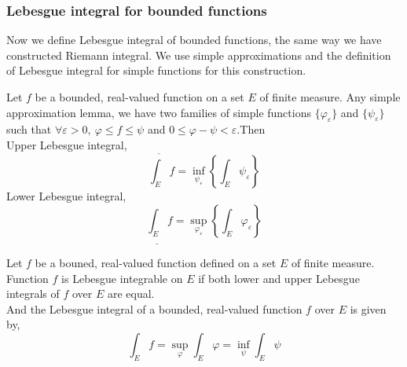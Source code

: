 \subsubsection{Lebesgue integral for bounded functions}
	Now we define Lebesgue integral of bounded functions, the same way we have constructed Riemann integral.
	We use simple approximations and the definition of Lebesgue integral for simple functions for this construction.
\begin{definition}
	Let $f$ be a bounded, real-valued function on a set $E$ of finite measure.
	Any simple approximation lemma, we have two families of simple functions $\{ \varphi_\varepsilon\}$ and $\{ \psi_\varepsilon \}$ such that $\forall \varepsilon > 0,\ \varphi \le f \le \psi$ and $0 \le \varphi-\psi < \varepsilon$.Then \\
	Upper Lebesgue integral,
	\begin{equation}
		\overline{\int_E} f = \inf_{\psi_\varepsilon} \left\{ \int_E \psi_\varepsilon \right\}
	\end{equation}
	Lower Lebesgue integral,
	\begin{equation}
		\underline{\int_E} f = \sup_{\varphi_\varepsilon} \left\{ \int_E \varphi_\varepsilon \right\}
	\end{equation}

\end{definition}

\begin{definition}
	Let $f$ be a bouned, real-valued function defined on a set $E$ of finite measure.
	Function $f$ is Lebesgue integrable on $E$ if both lower and upper Lebesgue integrals of $f$ over $E$ are equal.\\

	And the Lebesgue integral of a bounded, real-valued function $f$ over $E$ is given by,
	\begin{equation}
		\int_E f = \sup_\varphi \int_E \varphi = \inf_\psi \int_E \psi
	\end{equation}
\end{definition}

